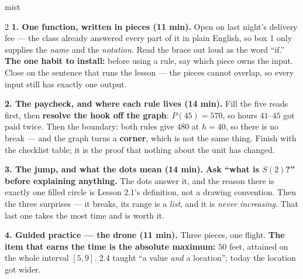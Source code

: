 \documentclass[10pt]{article}
\begin{document}
\boxguard
\begin{skillbox}[Lesson]{mist}
\begin{multicols}{2}
\textbf{1. One function, written in pieces (11 min).} Open on last night's delivery fee --- the class
already answered every part of it in plain English, so box 1 only supplies the \emph{name} and the
\emph{notation}. Read the brace out loud as the word ``if.'' \textbf{The one habit to install:} before
using a rule, say which piece owns the input. Close on the sentence that runs the lesson --- the
pieces cannot overlap, so every input still has exactly one output.

\textbf{2. The paycheck, and where each rule lives (14 min).} Fill the five reads first, then
\textbf{resolve the hook off the graph}: $P(45)=570$, so hours $41$--$45$ got paid twice. Then the
boundary: both rules give $480$ at $h=40$, so there is no break --- and the graph turns a
\textbf{corner}, which is not the same thing. Finish with the checklist table; it is the proof that
nothing about the unit has changed.

\textbf{3. The jump, and what the dots mean (14 min).} \textbf{Ask ``what is $S(2)$?'' before
explaining anything.} The dots answer it, and the reason there is exactly one filled circle is
Lesson 2.1's definition, not a drawing convention. Then the three surprises --- it breaks, its range
is a \emph{list}, and it is \emph{never increasing}. That last one takes the most time and is worth it.

\textbf{4. Guided practice --- the drone (11 min).} Three pieces, one flight. \textbf{The item that
earns the time is the absolute maximum:} $50$ feet, attained on the whole interval $[5,9]$. 2.4 taught
``a value \emph{and} a location''; today the location got wider.
\end{multicols}
\end{skillbox}
\end{document}
